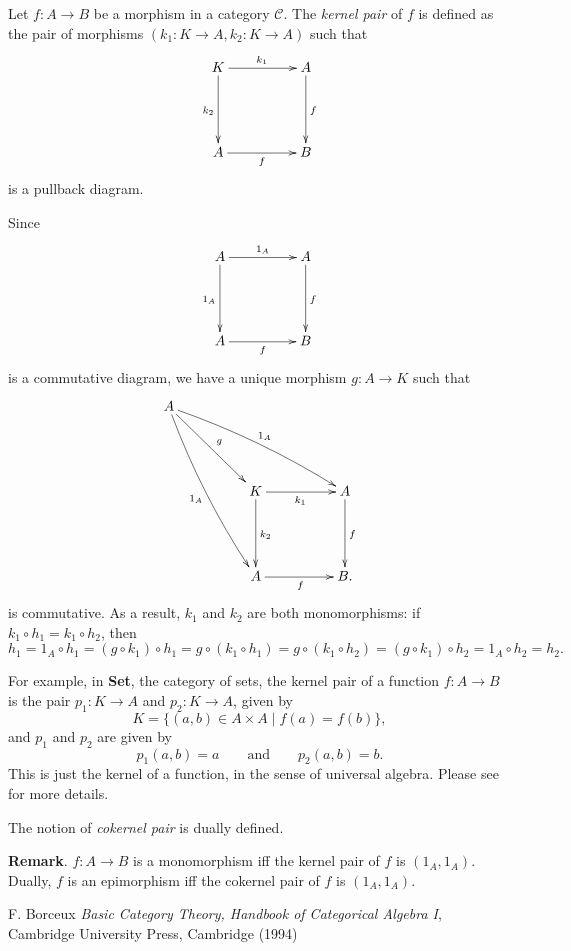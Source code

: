 \documentclass[12pt]{article}
\begin{document}
Let $f:A\to B$ be a morphism in a category $\mathcal{C}$.  The \emph{kernel pair} of $f$ is defined as the pair of morphisms $(k_1: K\to A, k_2:K\to A)$ such that 
$$\xymatrix@+=4pc{
{K}\ar[r]^{k_1}\ar[d]_{k_2} &{A}\ar[d]^{f} \\
{A}\ar[r]_{f}&{B}
}
$$
is a pullback diagram.

Since 
$$\xymatrix@+=4pc{
{A}\ar[r]^{1_A}\ar[d]_{1_A} &{A}\ar[d]^{f} \\
{A}\ar[r]_{f}&{B}
}
$$
is a commutative diagram, we have a unique morphism $g:A\to K$ such that
$$\xymatrix@+=4pc{
A\ar@/^1ex/[rrd]^{1_A} \ar@/_1ex/[rdd]_{1_A} \ar[rd]^g & & \\
& K \ar[d]^{k_2} \ar[r]_{k_1} & A\ar[d]^f \\
& A\ar[r]_f & B.
}
$$
is commutative.  As a result, $k_1$ and $k_2$ are both monomorphisms: if $k_1\circ h_1 = k_1\circ h_2$, then $$h_1 = 1_A \circ h_1 = (g\circ k_1) \circ h_1 = g\circ (k_1 \circ h_1) =g\circ (k_1 \circ h_2) = (g\circ k_1) \circ h_2 = 1_A \circ h_2 = h_2.$$

For example, in \textbf{Set}, the category of sets, the kernel pair of a function $f:A\to B$ is the pair $p_1:K\to A$ and $p_2:K\to A$, given by $$K=\lbrace (a,b) \in A\times A \mid f(a)=f(b) \rbrace,$$ and $p_1$ and $p_2$ are given by $$p_1(a,b)=a \qquad \mbox{and} \qquad p_2(a,b)=b.$$
This is just the kernel of a function, in the sense of universal algebra.  Please see  for more details.

The notion of \emph{cokernel pair} is dually defined.

\textbf{Remark}.  $f:A\to B$ is a monomorphism iff the kernel pair of $f$ is $(1_A,1_A)$.  Dually, $f$ is an epimorphism iff the cokernel pair of $f$ is $(1_A,1_A)$.


\begin{thebibliography}{9}
 F. Borceux \emph{Basic Category Theory, Handbook of Categorical Algebra I}, Cambridge University Press, Cambridge (1994)
\end{thebibliography}
\end{document}
